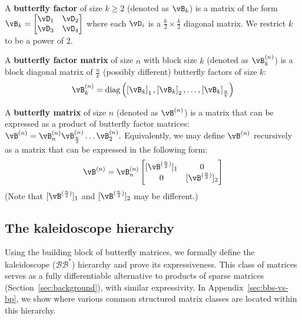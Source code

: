 \begin{definition} \label{def:bfactor}
    A \textbf{butterfly factor} of size $k\ge 2$ (denoted as $\vB_k$) is a matrix of the form
    \(
        \vB_k = \begin{bmatrix}
            \vD_1 & \vD_2 \\ \vD_3 & \vD_4
        \end{bmatrix}
    \)
    where each $\vD_i$ is a $\frac{k}{2} \times \frac{k}{2}$ diagonal matrix. We restrict $k$ to be a power of 2.
\end{definition}

\begin{definition}
     A \textbf{butterfly factor matrix} of size $n$ with block size $k$ (denoted as $\vB_k^{(n)}$) is a block diagonal matrix of $\frac{n}{k}$ (possibly different) butterfly factors of size $k$:
     \[
        \vB_k^{(n)} = \mathrm{diag} \left( \left[ \vB_k \right]_1, \left[ \vB_k \right]_2, \hdots, \left[ \vB_k \right]_\frac{n}{k} \right)
     \]
\end{definition}

\begin{definition} \label{def:bmatrix}
    A \textbf{butterfly matrix} of size $n$ (denoted as $\vB^{(n)}$) is a matrix that can be expressed as a product of butterfly factor matrices:
    \(
        \vB^{(n)} = \vB_n^{(n)} \vB_{\frac{n}{2}}^{(n)} \hdots \vB_2^{(n)}.
    \)
    Equivalently, we may define $\vB^{(n)}$ recursively as a matrix that can be expressed in the following form:
    \[
         \vB^{(n)} = \vB_n^{(n)} \begin{bmatrix}
            [\vB^{(\frac{n}{2})}]_1 & 0 \\
            0 & [\vB^{(\frac{n}{2})}]_2
         \end{bmatrix}
    \]
    (Note that $[\vB^{(\frac{n}{2})}]_1$ and $[\vB^{(\frac{n}{2})}]_2$ may be different.)
\end{definition}

\subsection{The kaleidoscope hierarchy}
\label{sec:theory-main}

Using the building block of butterfly matrices, we formally define the kaleidoscope
($\mathcal{B}\mathcal{B}^*$) hierarchy and prove its expressiveness. This class of matrices serves as a fully differentiable alternative to products of sparse matrices
(Section~\ref{sec:background}), with similar expressivity. In Appendix~\ref{sec:bbs-vs-bp}, we show where various common structured matrix classes are located within this hierarchy.


